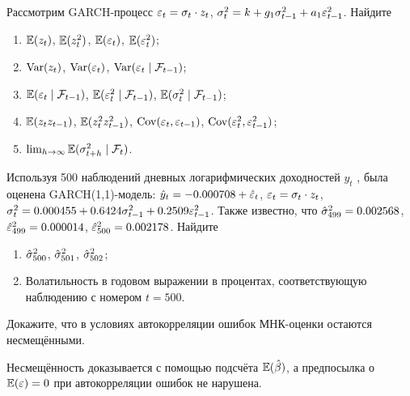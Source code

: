 \begin{problem}
Рассмотрим GARCH-процесс $\varepsilon_t=\sigma_t \cdot z_t$, $\sigma^2_t=k+g_1\sigma^2_{t-1}+a_1\varepsilon^2_{t-1}$. Найдите
\begin{enumerate}
\item $\mathbb{E}(z_t)$, $\mathbb{E}(z_t^2)$, $\mathbb{E}(\varepsilon_t)$, $\mathbb{E}(\varepsilon_t^2)$;
\item $\operatorname{Var}(z_t)$, $\operatorname{Var}(\varepsilon_t)$, $\operatorname{Var}(\varepsilon_t \mid \mathcal{F}_{t-1})$;
\item $\mathbb{E}(\varepsilon_t \mid \mathcal{F}_{t-1})$, $\mathbb{E}(\varepsilon_t^2 \mid \mathcal{F}_{t-1})$, $\mathbb{E}(\sigma^2_t \mid \mathcal{F}_{t-1})$;
\item $\mathbb{E}(z_tz_{t-1})$, $\mathbb{E}(z_t^2z_{t-1}^2)$, $\operatorname{Cov}(\varepsilon_t,\varepsilon_{t-1})$, $\operatorname{Cov}(\varepsilon_t^2,\varepsilon_{t-1}^2)$;
\item $\lim_{h\rightarrow\infty} \mathbb{E}(\sigma^2_{t+h} \mid \mathcal{F}_t)$.
\end{enumerate}


\begin{sol}
\end{sol}
\end{problem}



\begin{problem}
Используя 500 наблюдений дневных логарифмических доходностей $y_t$ ,
была оценена GARCH(1,1)-модель: $\hat{y}_t=-0.000708+\hat{\varepsilon}_t$, $\varepsilon_t=\sigma_t \cdot z_t$, $\sigma^2_t=0.000455+0.6424\sigma^2_{t-1}+0.2509\varepsilon^2_{t-1}$. Также известно, что $\hat{\sigma}^2_{499}=0.002568$, $\hat{\varepsilon}^2_{499}=0.000014$, $\hat{\varepsilon}^2_{500}=0.002178$.
Найдите
\begin{enumerate}
\item  $\hat{\sigma}^2_{500}$, $\hat{\sigma}^2_{501}$, $\hat{\sigma}^2_{502}$;
\item Волатильность в годовом выражении в процентах, соответствующую
наблюдению с номером $t = 500$.
\end{enumerate}


\begin{sol}
\end{sol}
\end{problem}



\begin{problem}
Докажите, что в условиях автокорреляции ошибок МНК-оценки остаются несмещёнными.
\begin{sol}
Несмещённость доказывается с помощью подсчёта $\mathbb{E}(\hat{\beta})$, а предпосылка о $\mathbb{E}(\varepsilon)=0$ при автокорреляции ошибок не нарушена.
\end{sol}
\end{problem}



